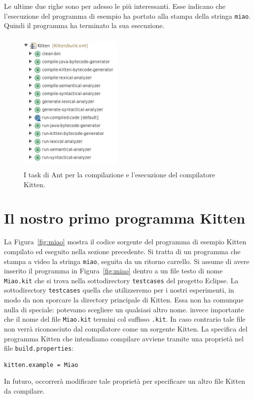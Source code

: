 \noindent
Le ultime due righe sono per adesso le pi\`u interessanti. Esse indicano che l'esecuzione del
programma di esempio ha portato alla stampa della stringa \texttt{miao}. Quindi il programma
ha terminato la sua esecuzione.

\begin{figure}[t]
\begin{center}
\includegraphics[width=5cm, height = 7cm]{pictures/ant_tasks.jpg}
\end{center}
\caption{I task di Ant per la compilazione e l'esecuzione del compilatore Kitten.}
\label{fig:ant_tasks}
\end{figure}
%
\section{Il nostro primo programma Kitten}\label{sec:first_kitten_programme}
%
La Figura~\ref{fig:miao} mostra il codice sorgente del programma
di esempio Kitten compilato ed eseguito nella sezione precedente. Si tratta
di un programma che stampa a video la
stringa \texttt{miao}, seguita da un ritorno carrello.
Si assume di avere inserito il programma
in Figura~\ref{fig:miao} dentro a un file testo di nome
\texttt{Miao.kit} che si trova nella sottodirectory
\texttt{testcases} del progetto Eclipse.
La sottodirectory \texttt{testcases} \e quella che utilizzeremo
per i nostri esperimenti, in modo da non sporcare la directory
principale di Kitten. Essa non ha comunque nulla di speciale:
potevamo scegliere un qualsiasi altro nome. \E invece importante
che il nome del file \texttt{Miao.kit} termini col suffisso \texttt{.kit}.
In caso contrario tale file non verr\`a riconosciuto dal compilatore
come un sorgente Kitten. La specifica del programma Kitten che
intendiamo compilare avviene tramite una propriet\`a nel file
\texttt{build.properties}:
%
\begin{verbatim}
kitten.example = Miao
\end{verbatim}
%
In futuro, occorrer\`a modificare tale propriet\`a per specificare un
altro file Kitten da compilare.


